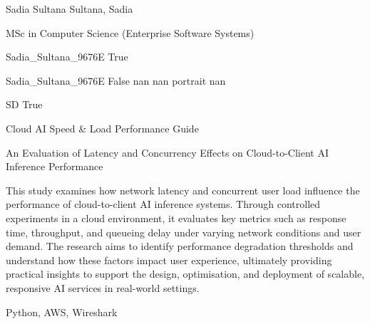 \documentclass[twoside]{report}
\begin{document}
\begingroup{}\relax



\def\Key{Sadia_Sultana_9676E}

{Sadia Sultana}
{Sultana, Sadia}

{MSc in Computer Science (Enterprise Software Systems)}

{Sadia_Sultana_9676E}
{True}

{Sadia_Sultana_9676E}
{False}
{nan}
{nan}
{portrait}
{nan}

{SD}
{True}

{Cloud AI Speed \& Load Performance Guide}

{An Evaluation of Latency and Concurrency Effects on Cloud-to-Client AI Inference Performance}

{This study examines how network latency and concurrent user load influence the performance of cloud-to-client AI inference systems. Through controlled experiments in a cloud environment, it evaluates key metrics such as response time, throughput, and queueing delay under varying network conditions and user demand. The research aims to identify performance degradation thresholds and understand how these factors impact user experience, ultimately providing practical insights to support the design, optimisation, and deployment of scalable, responsive AI services in real-world settings.}

{Python, AWS, Wireshark}
\end{document}
